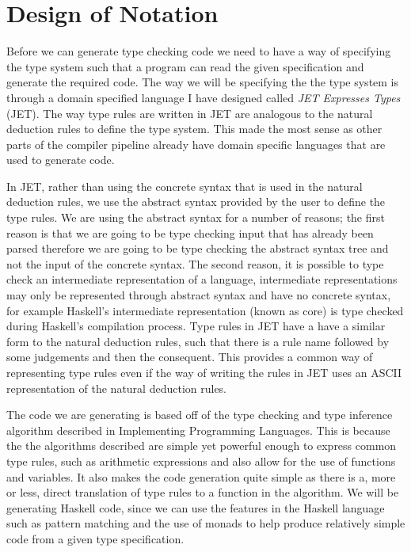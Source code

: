 \chapter{Design of Notation}
\label{chap:Method}
Before we can generate type checking code we need to have a way of specifying the type system such that a program can read the given specification and generate the required code.
The way we will be specifying the the type system is through a domain specified language I have designed called \textit{JET Expresses Types} (JET).
The way type rules are written in JET are analogous to the natural deduction rules to define the type system.
This made the most sense as other parts of the compiler pipeline already have domain specific languages that are used to generate code.

In JET, rather than using the concrete syntax that is used in the natural deduction rules, we use the abstract syntax provided by the user to define the type rules.
We are using the abstract syntax for a number of reasons; the first reason is that we are going to be type checking input that has already been parsed therefore we are going to be type checking the abstract syntax tree and not the input of the concrete syntax.
The second reason, it is possible to type check an intermediate representation of a language, intermediate representations may only be represented through abstract syntax and have no concrete syntax, for example Haskell's intermediate representation (known as core) is type checked during Haskell's compilation process\cite{marlow2004glasgow}.
Type rules in JET have a have a similar form to the natural deduction rules, such that there is a rule name followed by some judgements and then the consequent.
This provides a common way of representing type rules even if the way of writing the rules in JET uses an ASCII representation of the natural deduction rules.

The code we are generating is based off of the type checking and type inference algorithm described in Implementing Programming Languages\cite{ranta2012implementing}.
This is because the the algorithms described are simple yet powerful enough to express common type rules, such as arithmetic expressions and also allow for the use of functions and variables.
It also makes the code generation quite simple as there is a, more or less, direct translation of type rules to a function in the algorithm.
We will be generating Haskell code, since we can use the features in the Haskell language such as pattern matching and the use of monads to help produce relatively simple code from a given type specification.

